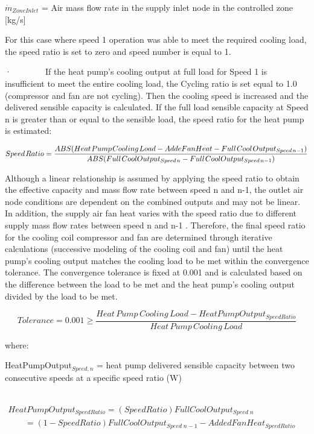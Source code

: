 \({{{\dot m}_{ZoneInlet}}}\) = Air mass flow rate in the supply inlet node in the controlled zone {[}kg/s{]}

For this case where speed 1 operation was able to meet the required cooling load, the speed ratio is set to zero and speed number is equal to 1.

·~~~~~~~~If the heat pump's cooling output at full load for Speed 1 is insufficient to meet the entire cooling load, the Cycling ratio is set equal to 1.0 (compressor and fan are not cycling). Then the cooling speed is increased and the delivered sensible capacity is calculated. If the full load sensible capacity at Speed n is greater than or equal to the sensible load, the speed ratio for the heat pump is estimated:

\begin{equation}
Speed{\kern 1pt} Ratio = \frac{{ABS(Heat{\kern 1pt} Pump{\kern 1pt} Cooling{\kern 1pt} Load - AddeFanHeat - Full{\kern 1pt} Cool{\kern 1pt} Outpu{t_{Speed{\kern 1pt} n - 1}})}}{{ABS(Full{\kern 1pt} CoolOutpu{t_{Speed{\kern 1pt} n}} - Full{\kern 1pt} CoolOutpu{t_{Speed{\kern 1pt} n - 1}})}} 
\end{equation}

Although a linear relationship is assumed by applying the speed ratio to obtain the effective capacity and mass flow rate between speed n and n-1, the outlet air node conditions are dependent on the combined outputs and may not be linear. In addition, the supply air fan heat varies with the speed ratio due to different supply mass flow rates between speed n and n-1 . Therefore, the final speed ratio for the cooling coil compressor and fan are determined through iterative calculations (successive modeling of the cooling coil and fan) until the heat pump's cooling output matches the cooling load to be met within the convergence tolerance. The convergence tolerance is fixed at 0.001 and is calculated based on the difference between the load to be met and the heat pump's cooling output divided by the load to be met.

\begin{equation}
Tolerance = 0.001 \ge \frac{{Heat\,Pump\,Cooling\,Load - HeatPumpOutpu{t_{SpeedRatio}}}}{{Heat\,Pump\,Cooling\,Load}}
\end{equation}

where:

HeatPumpOutput\(_{Speed,n}\) = heat pump delivered sensible capacity between two consecutive speeds at a specific speed ratio (W)

~~~~~~ \(\begin{array}{l}HeatPumpOutpu{t_{SpeedRatio}} = (SpeedRatio)FullCoolOutpu{t_{Speed\;n}}\\\;\;\;\;\;\;\; = (1 - SpeedRatio)FullCoolOutpu{t_{Speed\;n - 1}} - AddedFanHea{t_{SpeedRatio}}\end{array}\)

